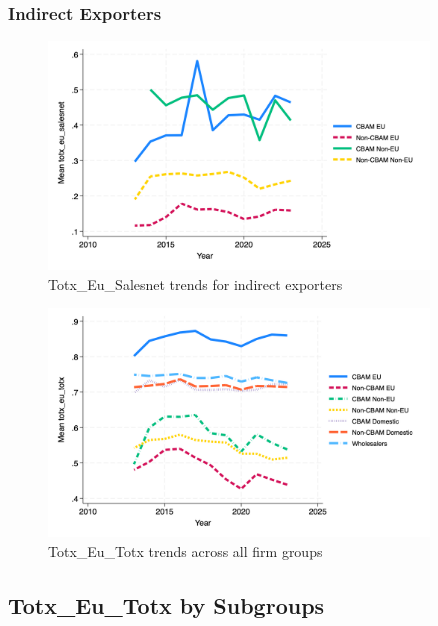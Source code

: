 \documentclass{article}
\begin{document}
\subsubsection{Indirect Exporters}
\begin{figure}[h!]
\centering
\includegraphics[width=0.9\textwidth]{totx_eu_salesnet_indir.png}
\caption{Totx_Eu_Salesnet trends for indirect exporters}
\label{fig:totx_eu_salesnet_indir}
\end{figure}

\begin{figure}[h!]
\centering
\includegraphics[width=0.9\textwidth]{totx_eu_totx_main_groups.png}
\caption{Totx_Eu_Totx trends across all firm groups}
\label{fig:totx_eu_totx_main}
\end{figure}

\subsection{Totx_Eu_Totx by Subgroups}
\end{document}
